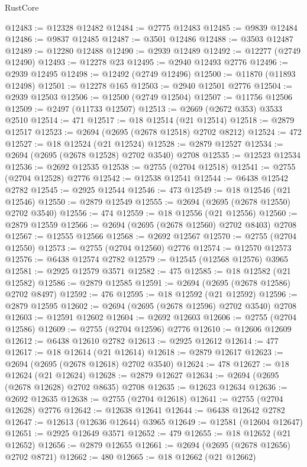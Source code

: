 \begin{lexlean}{RustCore}
\begin{coremodule}
@12483 := @12328 @12482
@12484 := @2775 @12483
@12485 := @9839 @12484
@12486 := @9837 @12485
@12487 := @3501 @12486
@12488 := @3503 @12487
@12489 := @12280 @12488
@12490 := @2939 @12489
@12492 := @12277 (@2749 @12490)
@12493 := @12278 @23
@12495 := @2940 @12493 @2776
@12496 := @2939 @12495
@12498 := @12492 (@2749 @12496)
@12500 := @11870 (@11893 @12498)
@12501 := @12278 @165
@12503 := @2940 @12501 @2776
@12504 := @2939 @12503
@12506 := @12500 (@2749 @12504)
@12507 := @11756 @12506
@12509 := @2497 (@11733 @12507)
@12513 := @2669 (@2672 @353) @3533 @2510
@12514 := 471
@12517 := @18 @12514 (@21 @12514)
@12518 := @2879 @12517
@12523 := @2694 (@2695 (@2678 @12518) @2702 @8212)
@12524 := 472
@12527 := @18 @12524 (@21 @12524)
@12528 := @2879 @12527
@12534 := @2694 (@2695 (@2678 @12528) @2702 @3540) @2708
@12535 := @12523 @12534
@12536 := @2692 @12535
@12538 := @2755 (@2704 @12518)
@12541 := @2755 (@2704 @12528) @2776
@12542 := @12538 @12541
@12544 := @6438 @12542 @2782
@12545 := @2925 @12544
@12546 := 473
@12549 := @18 @12546 (@21 @12546)
@12550 := @2879 @12549
@12555 := @2694 (@2695 (@2678 @12550) @2702 @3540)
@12556 := 474
@12559 := @18 @12556 (@21 @12556)
@12560 := @2879 @12559
@12566 := @2694 (@2695 (@2678 @12560) @2702 @8403) @2708
@12567 := @12555 @12566
@12568 := @2692 @12567
@12570 := @2755 (@2704 @12550)
@12573 := @2755 (@2704 @12560) @2776
@12574 := @12570 @12573
@12576 := @6438 @12574 @2782
@12579 := @12545 (@12568 @12576) @3965
@12581 := @2925 @12579 @3571
@12582 := 475
@12585 := @18 @12582 (@21 @12582)
@12586 := @2879 @12585
@12591 := @2694 (@2695 (@2678 @12586) @2702 @8497)
@12592 := 476
@12595 := @18 @12592 (@21 @12592)
@12596 := @2879 @12595
@12602 := @2694 (@2695 (@2678 @12596) @2702 @3540) @2708
@12603 := @12591 @12602
@12604 := @2692 @12603
@12606 := @2755 (@2704 @12586)
@12609 := @2755 (@2704 @12596) @2776
@12610 := @12606 @12609
@12612 := @6438 @12610 @2782
@12613 := @2925 @12612
@12614 := 477
@12617 := @18 @12614 (@21 @12614)
@12618 := @2879 @12617
@12623 := @2694 (@2695 (@2678 @12618) @2702 @3540)
@12624 := 478
@12627 := @18 @12624 (@21 @12624)
@12628 := @2879 @12627
@12634 := @2694 (@2695 (@2678 @12628) @2702 @8635) @2708
@12635 := @12623 @12634
@12636 := @2692 @12635
@12638 := @2755 (@2704 @12618)
@12641 := @2755 (@2704 @12628) @2776
@12642 := @12638 @12641
@12644 := @6438 @12642 @2782
@12647 := @12613 (@12636 @12644) @3965
@12649 := @12581 (@12604 @12647)
@12651 := @2925 @12649 @3571
@12652 := 479
@12655 := @18 @12652 (@21 @12652)
@12656 := @2879 @12655
@12661 := @2694 (@2695 (@2678 @12656) @2702 @8721)
@12662 := 480
@12665 := @18 @12662 (@21 @12662)

\end{coremodule}
\end{lexlean}

